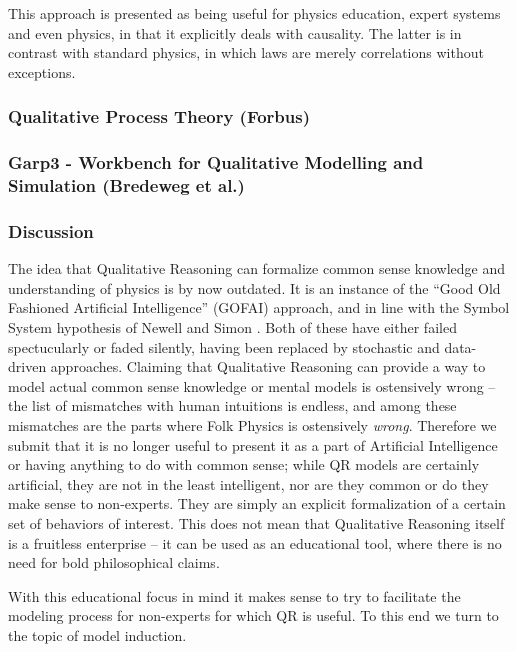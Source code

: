 \documentclass{article}
\begin{document}
This approach is presented as being useful for physics education, expert
systems and even physics, in that it explicitly deals with causality. The
latter is in contrast with standard physics, in which laws are merely
correlations without exceptions.


\subsubsection{Qualitative Process Theory (Forbus)}

\subsubsection{Garp3 - Workbench for Qualitative Modelling and Simulation (Bredeweg et al.)}

\subsubsection{Discussion}

The idea that Qualitative Reasoning can formalize common sense knowledge and
understanding of physics is by now outdated. It is an instance of the ``Good
Old Fashioned Artificial Intelligence'' (GOFAI) approach, and in line with the
Symbol System hypothesis of Newell and Simon \cite{newell}.
Both of these have either failed spectucularly or faded silently, having been
replaced by stochastic and data-driven approaches.  Claiming that Qualitative
Reasoning can provide a way to model actual common sense knowledge or mental
models is ostensively wrong -- the list of mismatches with human intuitions is
endless, and among these mismatches are the parts where Folk Physics is
ostensively {\em wrong}. Therefore we submit that it is no longer useful to
present it as a part of Artificial Intelligence or having anything to do with
common sense; while QR models are certainly artificial, they are not in the
least intelligent, nor are they common or do they make sense to non-experts.
They are simply an explicit formalization of a certain set of behaviors of
interest. This does not mean that Qualitative Reasoning itself is a fruitless
enterprise -- it can be used as an educational tool, where there is no need for
bold philosophical claims.

With this educational focus in mind it makes sense to try to facilitate the
modeling process for non-experts for which QR is useful. To this end we turn to
the topic of model induction.
\end{document}

